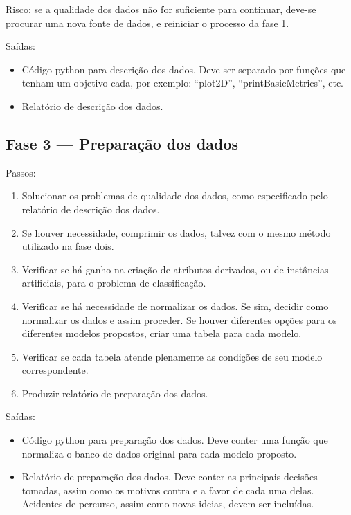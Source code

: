 \documentclass[12pt,oneside,a4paper]{article}
\begin{document}
Risco: se a qualidade dos dados não for suficiente para continuar, deve-se procurar uma nova fonte de dados, e reiniciar o processo da fase 1.

Saídas:

\begin{itemize}
    \item Código python para descrição dos dados. Deve ser separado por funções que tenham um objetivo cada, por exemplo: ``plot2D'', ``printBasicMetrics'', etc.
    \item Relatório de descrição dos dados.
\end{itemize}

\subsection{Fase 3 --- Preparação dos dados}

Passos:

\begin{enumerate}

\item Solucionar os problemas de qualidade dos dados, como especificado pelo relatório de descrição dos dados.

\item Se houver necessidade, comprimir os dados, talvez com o mesmo método utilizado na fase dois.

\item Verificar se há ganho na criação de atributos derivados, ou de instâncias artificiais, para o problema de classificação.

\item Verificar se há necessidade de normalizar os dados. Se sim, decidir como normalizar os dados e assim proceder. Se houver diferentes opções para os diferentes modelos propostos, criar uma tabela para cada modelo.

\item Verificar se cada tabela atende plenamente as condições de seu modelo correspondente.

\item Produzir relatório de preparação dos dados.
  
\end{enumerate}

Saídas:

\begin{itemize}

\item Código python para preparação dos dados. Deve conter uma função que normaliza o banco de dados original para cada modelo proposto.
  
\item Relatório de preparação dos dados. Deve conter as principais decisões tomadas, assim como os motivos contra e a favor de cada uma delas. Acidentes de percurso, assim como novas ideias, devem ser incluídas.
  
\end{itemize}
\end{document}
